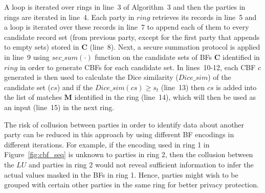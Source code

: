 \documentclass{sig-alternate}
\begin{document}
A loop is iterated over rings in line~3 of Algorithm~3 and then the
parties in rings are iterated in line~4.
Each party in $ring$ retrieves its records in line~5 and a loop is
iterated over these records in line~7 to append each of them to
every candidate record set (from previous party, except for the first party
that appends to empty sets) stored in $\mathbf{C}$ (line~8).
Next, a secure summation protocol is applied in line~9 using 
$sec\_sum(\cdot)$ function
on the candidate sets of BFs $\mathbf{C}$ identified in $ring$
in order to generate CBFs for each candidate set. In lines~10-12, each CBF $c$ generated
is then used to calculate the Dice similarity ($Dice\_sim$) of the candidate 
set ($cs$) and if the $Dice\_sim(cs) \ge s_t$ (line~13) then $cs$ is added into
the list of matches $\mathbf{M}$
identified in the ring (line~14), which will then be used as an input (line~15)
in the next ring.

The risk of collusion between parties 
in order to identify data about another party can be reduced in
this approach by using different BF encodings
in different iterations. For example, if the encoding
used in ring 1 in Figure~\ref{fig:cbf_seq} is unknown to
parties in ring 2, then the collusion between the $LU$ and parties in ring
2 would not reveal sufficient information to infer the
actual values masked in the BFs in ring 1. 
Hence, parties might wish to be grouped with certain other parties in the
same ring for better privacy protection. 
\end{document}
